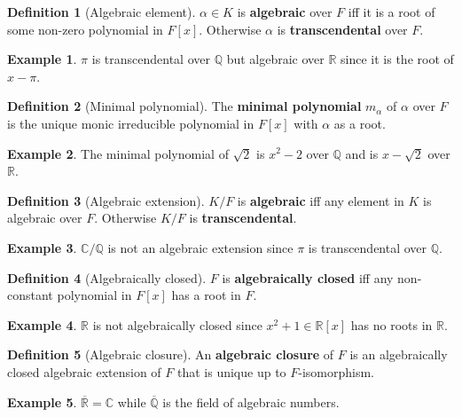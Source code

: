 \documentclass{article}
\newcommand{\Q}{\mathbb{Q}}
\newcommand{\R}{\mathbb{R}}
\newcommand{\C}{\mathbb{C}}
\renewcommand{\sb}[1]{\left[ #1 \right]}
\theoremstyle{definition}\newtheorem*{definition}{Definition}
\theoremstyle{definition}\newtheorem*{example}{Example}
\theoremstyle{definition}\newtheorem*{remark}{Remark}
\begin{document}
\begin{definition}[Algebraic element]
$ \alpha \in K $ is \textbf{algebraic} over $ F $ iff it is a root of some non-zero polynomial in $ F\sb{x} $. Otherwise $ \alpha $ is \textbf{transcendental} over $ F $.
\end{definition}

\begin{example}
$ \pi $ is transcendental over $ \Q $ but algebraic over $ \R $ since it is the root of $ x - \pi $.
\end{example}

\begin{definition}[Minimal polynomial]
The \textbf{minimal polynomial} $ m_\alpha $ of $ \alpha $ over $ F $ is the unique monic irreducible polynomial in $ F\sb{x} $ with $ \alpha $ as a root.
\end{definition}

\begin{example}
The minimal polynomial of $ \sqrt{2} $ is $ x^2 - 2 $ over $ \Q $ and is $ x - \sqrt{2} $ over $ \R $.
\end{example}

\begin{definition}[Algebraic extension]
$ K / F $ is \textbf{algebraic} iff any element in $ K $ is algebraic over $ F $. Otherwise $ K / F $ is \textbf{transcendental}.
\end{definition}

\begin{example}
$ \C / \Q $ is not an algebraic extension since $ \pi $ is transcendental over $ \Q $.
\end{example}

\begin{definition}[Algebraically closed]
$ F $ is \textbf{algebraically closed} iff any non-constant polynomial in $ F\sb{x} $ has a root in $ F $.
\end{definition}

\begin{example}
$ \R $ is not algebraically closed since $ x^2 + 1 \in \R\sb{x} $ has no roots in $ \R $.
\end{example}

\begin{definition}[Algebraic closure]
An \textbf{algebraic closure} of $ F $ is an algebraically closed algebraic extension of $ F $ that is unique up to $ F $-isomorphism.
\end{definition}

\begin{example}
$ \overline{\R} = \C $ while $ \overline{\Q} $ is the field of algebraic numbers.
\end{example}
\end{document}
